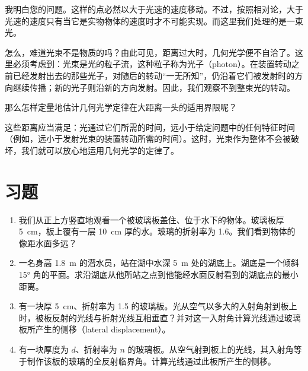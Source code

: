 \begin{dialogue}
\stdb 我明白您的问题。这样的点必然以大于光速的速度移动。不过，按照相对论，大于光速的速度只有当它是实物物体的速度时才不可能实现。而这里我们处理的是一束光。

\tchr 怎么，难道光束不是物质的吗？由此可见，距离过大时，几何光学便不自洽了。这里必须考虑到：光束是光的粒子流，这种粒子称为光子（photon）。在装置转动之前已经发射出去的那些光子，对随后的转动“一无所知”，仍沿着它们被发射时的方向继续传播；新的光子则沿新的方向发射。因此，我们观察不到整束光的转动。

\stdb 那么怎样定量地估计几何光学定律在大距离一头的适用界限呢？

\tchr 这些距离应当满足：光通过它们所需的时间，远小于给定问题中的任何特征时间（例如，远小于发射光束的装置转动所需的时间）。这时，光束作为整体不会被破坏，我们就可以放心地运用几何光学的定律了。


\end{dialogue}

\section*{习题}
\label{prob-31}

\begin{enumerate}[resume*=problems]
\item 我们从正上方竖直地观看一个被玻璃板盖住、位于水下的物体。玻璃板厚 \SI{5}{\centi\meter}，板上覆有一层 \SI{10}{\centi\meter} 厚的水。玻璃的折射率为 1.6。我们看到物体的像距水面多远？

\item 一名身高 \SI{1.8}{\meter} 的潜水员，站在湖中水深 \SI{5}{\meter} 处的湖底上。湖底是一个倾斜 \ang{15} 角的平面。求沿湖底从他所站之点到他能经水面反射看到的湖底点的最小距离。

\item 有一块厚 \SI{5}{\centi\meter}、折射率为 1.5 的玻璃板。光从空气以多大的入射角射到板上时，被板反射的光线与折射光线互相垂直？并对这一入射角计算光线通过玻璃板所产生的侧移（lateral displacement）。

\item 有一块厚度为 $d$、折射率为 $n$ 的玻璃板。从空气射到板上的光线，其入射角等于制作该板的玻璃的全反射临界角。计算光线通过此板所产生的侧移。

\end{enumerate}

